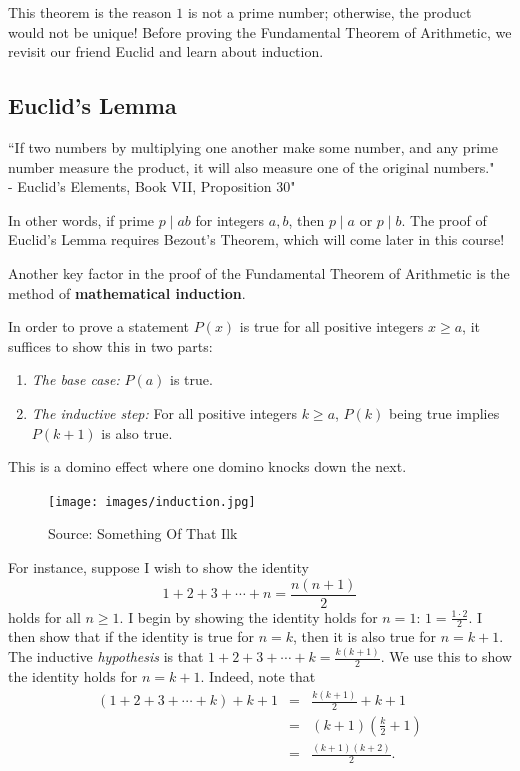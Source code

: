 This theorem is the reason $1$ is not a prime number; otherwise, the product would not be unique! Before proving the Fundamental Theorem of Arithmetic, we revisit our friend Euclid and learn about induction. 
\clearpage

\subsection{Euclid's Lemma}
\begin{displayquote} ``If two numbers by multiplying one another make some number, and any prime number measure the product, it will also measure one of the original numbers." \\ - Euclid's Elements, Book VII, Proposition 30" \end{displayquote}
In other words, if prime $p\mid ab$ for integers $a,b$, then $p\mid a$ or $p\mid b$. The proof of Euclid's Lemma requires Bezout's Theorem, which will come later in this course! 

\clearpage
Another key factor in the proof of the Fundamental Theorem of Arithmetic is the method of \textbf{mathematical induction}.
	
\begin{defi}[Induction] In order to prove a statement $P(x)$ is true for all positive integers $x\ge a$, it suffices to show this in two parts: \begin{enumerate}
		\item \textit{The base case:} $P(a)$ is true.
		\item \textit{The inductive step:} For all positive integers $k\ge a$, $P(k)$ being true implies $P(k+1)$ is also true.
		\end{enumerate}  
		This is a domino effect where one domino knocks down the next.
\end{defi}

\clearpage

\begin{figure}[h]
	\centering\texttt{[image: images/induction.jpg]}
	\caption{Source: Something Of That Ilk}
\end{figure}
\clearpage

For instance, suppose I wish to show the identity $$1+2+3+\cdots+n=\frac{n(n+1)}{2}$$ holds for all $n\ge 1$.
I begin by showing the identity holds for $n=1$: $1=\frac{1\cdot 2}{2}$. I then show that if the identity is true for $n=k$, then it is also true for $n=k+1$. The inductive \textit{hypothesis} is that $1+2+3+\cdots+k=\frac{k(k+1)}{2}$. We use this to show the identity holds for $n=k+1$. Indeed, note that \begin{eqnarray*} \left(1+2+3+\cdots+k\right)+k+1 &=& \frac{k(k+1)}{2}+k+1 \\ &=& (k+1)\left(\frac{k}{2}+1\right) \\ &=& \frac{(k+1)(k+2)}{2}. \end{eqnarray*}

